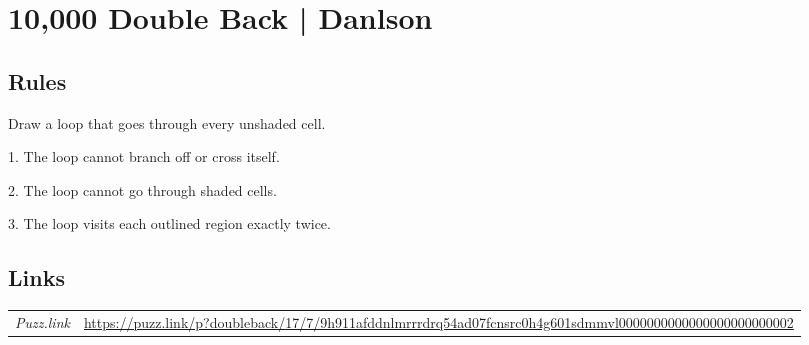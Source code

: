 \section{10,000 Double Back | {\normalfont Danlson}}
\label{sec:20-10000-double-back-danlson}

\subsection*{Rules}
\begin{markdown}
Draw a loop that goes through every unshaded cell.

1. The loop cannot branch off or cross itself.

2. The loop cannot go through shaded cells.

3. The loop visits each outlined region exactly twice.
\end{markdown}
\subsection*{Links}
\begin{tabularx}{\textwidth}{l X}
\emph{Puzz.link} & \url{https://puzz.link/p?doubleback/17/7/9h911afddnlmrrrdrq54ad07fcnsrc0h4g601sdmmvl0000000000000000000000002} \\
\end{tabularx}
\pagebreak
